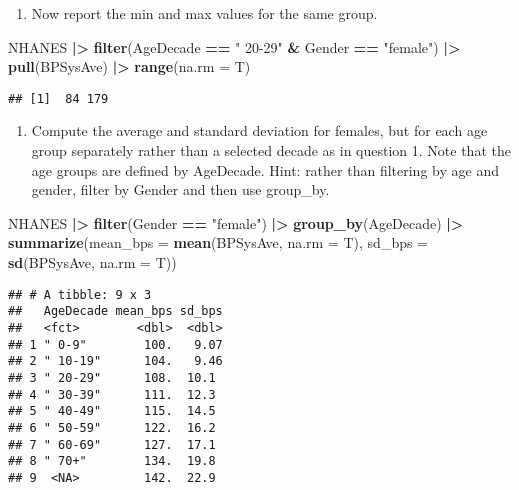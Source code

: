 \documentclass[
]{article}
\newenvironment{Shaded}{\begin{snugshade}}{\end{snugshade}}
\newcommand{\AttributeTok}[1]{\textcolor[rgb]{0.13,0.29,0.53}{#1}}
\newcommand{\FunctionTok}[1]{\textcolor[rgb]{0.13,0.29,0.53}{\textbf{#1}}}
\newcommand{\NormalTok}[1]{#1}
\newcommand{\SpecialCharTok}[1]{\textcolor[rgb]{0.81,0.36,0.00}{\textbf{#1}}}
\newcommand{\StringTok}[1]{\textcolor[rgb]{0.31,0.60,0.02}{#1}}
\providecommand{\tightlist}{%
  \setlength{\itemsep}{0pt}\setlength{\parskip}{0pt}}
\begin{document}
\begin{enumerate}
\def\labelenumi{\arabic{enumi}.}
\setcounter{enumi}{2}
\tightlist
\item
  Now report the min and max values for the same group.
\end{enumerate}

\begin{Shaded}
\begin{Highlighting}[]
\NormalTok{NHANES }\SpecialCharTok{|\textgreater{}} 
      \FunctionTok{filter}\NormalTok{(AgeDecade }\SpecialCharTok{==} \StringTok{" 20{-}29"} \SpecialCharTok{\&}\NormalTok{ Gender }\SpecialCharTok{==} \StringTok{"female"}\NormalTok{)  }\SpecialCharTok{|\textgreater{}} 
      \FunctionTok{pull}\NormalTok{(BPSysAve) }\SpecialCharTok{|\textgreater{}} \FunctionTok{range}\NormalTok{(}\AttributeTok{na.rm =}\NormalTok{ T)}
\end{Highlighting}
\end{Shaded}

\begin{verbatim}
## [1]  84 179
\end{verbatim}

\begin{enumerate}
\def\labelenumi{\arabic{enumi}.}
\setcounter{enumi}{3}
\tightlist
\item
  Compute the average and standard deviation for females, but for each
  age group separately rather than a selected decade as in question 1.
  Note that the age groups are defined by AgeDecade. Hint: rather than
  filtering by age and gender, filter by Gender and then use group\_by.
\end{enumerate}

\begin{Shaded}
\begin{Highlighting}[]
\NormalTok{NHANES }\SpecialCharTok{|\textgreater{}} 
  \FunctionTok{filter}\NormalTok{(Gender }\SpecialCharTok{==} \StringTok{"female"}\NormalTok{) }\SpecialCharTok{|\textgreater{}} 
  \FunctionTok{group\_by}\NormalTok{(AgeDecade) }\SpecialCharTok{|\textgreater{}} 
  \FunctionTok{summarize}\NormalTok{(}\AttributeTok{mean\_bps =} \FunctionTok{mean}\NormalTok{(BPSysAve, }\AttributeTok{na.rm =}\NormalTok{ T),}
            \AttributeTok{sd\_bps =} \FunctionTok{sd}\NormalTok{(BPSysAve, }\AttributeTok{na.rm =}\NormalTok{ T))}
\end{Highlighting}
\end{Shaded}

\begin{verbatim}
## # A tibble: 9 x 3
##   AgeDecade mean_bps sd_bps
##   <fct>        <dbl>  <dbl>
## 1 " 0-9"        100.   9.07
## 2 " 10-19"      104.   9.46
## 3 " 20-29"      108.  10.1 
## 4 " 30-39"      111.  12.3 
## 5 " 40-49"      115.  14.5 
## 6 " 50-59"      122.  16.2 
## 7 " 60-69"      127.  17.1 
## 8 " 70+"        134.  19.8 
## 9  <NA>         142.  22.9
\end{verbatim}
\end{document}
